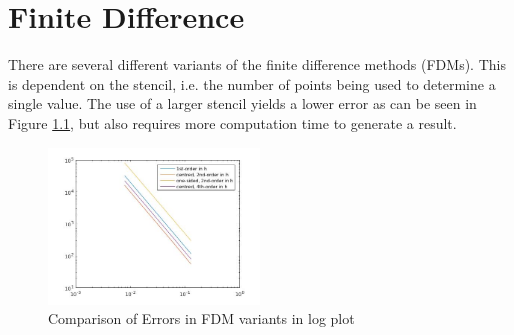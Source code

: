 \chapter{Finite Difference}
There are several different variants of the  finite difference methods (FDMs). This is dependent on the stencil, i.e. the number of points being used to determine a single value. The use of a larger stencil yields a lower error as can be seen in Figure \ref{fig:errorgraph}, but also requires more computation time to generate a result.
\begin{figure}[H] 
 \centering
 \includegraphics[width=0.5\textwidth]{Images/Error.jpg}
 \caption{Comparison of Errors in FDM variants in log plot}
 \label{fig:errorgraph}
\end{figure}
